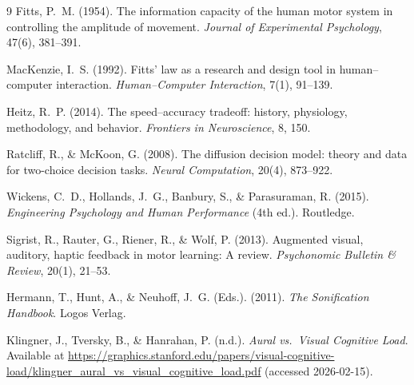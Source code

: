 \documentclass[12pt,letterpaper]{article}
\begin{document}
\begin{thebibliography}{9}\setlength{\itemsep}{0pt}
Fitts, P.~M. (1954). The information capacity of the human motor system in controlling the amplitude of movement. \emph{Journal of Experimental Psychology}, 47(6), 381--391.

MacKenzie, I.~S. (1992). Fitts' law as a research and design tool in human--computer interaction. \emph{Human--Computer Interaction}, 7(1), 91--139.

Heitz, R.~P. (2014). The speed--accuracy tradeoff: history, physiology, methodology, and behavior. \emph{Frontiers in Neuroscience}, 8, 150.

Ratcliff, R., \& McKoon, G. (2008). The diffusion decision model: theory and data for two-choice decision tasks. \emph{Neural Computation}, 20(4), 873--922.

Wickens, C.~D., Hollands, J.~G., Banbury, S., \& Parasuraman, R. (2015). \emph{Engineering Psychology and Human Performance} (4th ed.). Routledge.

Sigrist, R., Rauter, G., Riener, R., \& Wolf, P. (2013). Augmented visual, auditory, haptic feedback in motor learning: A review. \emph{Psychonomic Bulletin \& Review}, 20(1), 21--53.

Hermann, T., Hunt, A., \& Neuhoff, J.~G. (Eds.). (2011). \emph{The Sonification Handbook}. Logos Verlag.

Klingner, J., Tversky, B., \& Hanrahan, P. (n.d.). \emph{Aural vs.\ Visual Cognitive Load}. Available at \url{https://graphics.stanford.edu/papers/visual-cognitive-load/klingner_aural_vs_visual_cognitive_load.pdf} (accessed 2026-02-15).
\end{thebibliography}
\end{document}
